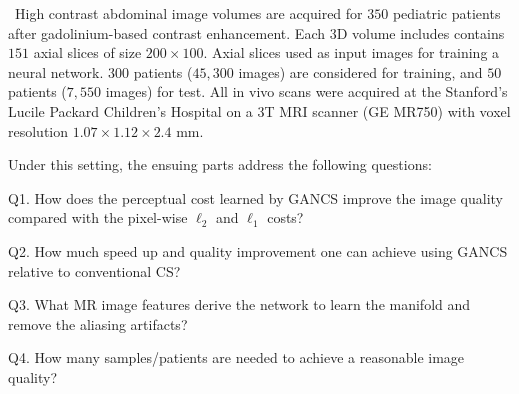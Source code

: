 \documentclass{journal}
\begin{document}


~High contrast abdominal image volumes are acquired for $350$ pediatric patients after gadolinium-based contrast enhancement. Each 3D volume includes contains $151$ axial slices of size $200 \times 100$. Axial slices used as input images for training a neural network. $300$ patients ($45,300$ images) are considered for training, and $50$ patients ($7,550$ images) for test. All in vivo scans were acquired at the Stanford’s Lucile Packard Children’s Hospital on a 3T MRI scanner (GE MR750) with voxel resolution $1.07 \times 1.12 \times 2.4$ mm. 



Under this setting, the ensuing parts address the following questions: 



Q1. How does the perceptual cost learned by GANCS improve the image quality compared with the pixel-wise $\ell_2$ and $\ell_1$ costs? 

Q2. How much speed up and quality improvement one can achieve using GANCS relative to conventional CS? 

Q3. What MR image features derive the network to learn the manifold and remove the aliasing artifacts?

Q4. How many samples/patients are needed to achieve a reasonable image quality?




\end{document}

